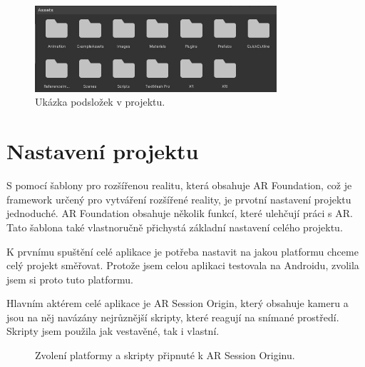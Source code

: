 \documentclass[12pt, a4paper,
twoside,        %
openright
]{report}
\begin{document}
	
	
		\begin{figure}[h!]
		\centering 
		\includegraphics[width=0.8\textwidth]{image/assets.jpg} 
		\caption{Ukázka podsložek v projektu.} 
		\label{fig:podslozky} 
	\end{figure}
	
	
	
	\newpage
	
\section{Nastavení projektu}
\label{sec:nastaveni_projektu}
S pomocí šablony pro rozšířenou realitu, která obsahuje AR Foundation, což je framework určený pro vytváření rozšířené reality, je prvotní nastavení projektu jednoduché. AR Foundation obsahuje několik funkcí, které ulehčují práci s AR. Tato šablona také vlastnoručně přichystá základní nastavení celého projektu. 

K prvnímu spuštění celé aplikace je potřeba nastavit na jakou platformu chceme celý projekt směřovat. Protože jsem celou aplikaci testovala na Androidu, zvolila jsem si proto tuto platformu.

Hlavním aktérem celé aplikace je AR Session Origin, který obsahuje kameru a jsou na něj navázány nejrůznější skripty, které reagují na snímané prostředí. Skripty jsem použila jak vestavěné, tak i vlastní.

\begin{figure}[h!]
	\centering
	\qquad
	\caption{Zvolení platformy a skripty připnuté k AR Session Originu.}
	\label{fig:nastaveni_unity}
\end{figure}
\end{document}
